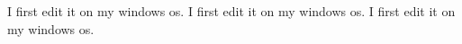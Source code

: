I first edit it on my windows os.
I first edit it on my windows os.
I first edit it on my windows os.